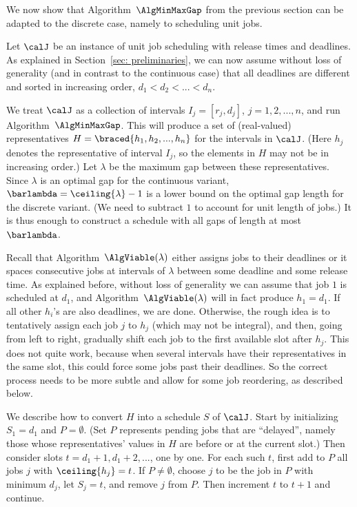 We now show that Algorithm~$\AlgMinMaxGap$ from the previous section can be adapted
to the discrete case, namely to scheduling unit jobs.

Let $\calJ$ be an instance of unit job scheduling with release times and deadlines.   
As explained in Section~\ref{sec: preliminaries},  we can now assume 
without loss of generality (and in contrast to the continuous case) that
all deadlines are different and sorted in increasing order, $d_1 < d_2 < ... < d_n$.

We treat $\calJ$ as a collection of intervals $I_j = [r_j,d_j]$, $j=1,2,...,n$, and
run Algorithm~$\AlgMinMaxGap$. This will produce a set of
(real-valued) representatives $H = \braced{h_1,h_2,...,h_n}$ for the intervals in $\calJ$. 
(Here $h_j$ denotes the representative of interval $I_j$, so the elements in $H$ may not be in increasing order.)
Let $\lambda$ be the maximum gap between these representatives. Since $\lambda$
is an optimal gap for the continuous variant, $\barlambda = \ceiling{\lambda}-1$
is a lower bound on the optimal gap length for the discrete variant.
(We need to subtract $1$ to account for unit length of jobs.)
It is thus enough to construct a schedule with all gaps of length at most $\barlambda$.

Recall that Algorithm~$\AlgViable(\lambda)$ either assigns jobs to their deadlines
or it spaces consecutive jobs at intervals of $\lambda$ between some deadline and some release time.
As explained before, without loss of generality we can assume that job $1$ is scheduled at $d_1$, and
Algorithm~$\AlgViable(\lambda)$ will in fact produce $h_1 = d_1$. 
If all other $h_i$'s are also deadlines, we are done. Otherwise, the rough idea is
to tentatively assign each job $j$ to $h_j$ (which may not be integral), and then, going from left to right,
gradually shift each job to the first available slot after $h_j$. This does not quite
work, because when several intervals have their representatives in the same slot, this
could force some jobs past their deadlines. So the correct process needs to be more
subtle and allow for some job reordering, as described below.



\medskip
{}
We describe how to convert $H$ into a schedule $S$ of $\calJ$. Start by initializing $S_1 = d_1$ and $P=\emptyset$. 
(Set $P$ represents pending jobs that are ``delayed'', namely those
whose representatives' values in $H$ are before or at the current slot.)
Then consider slots $t = d_1+1, d_1 +2 , ...$, one by one. For each such $t$, first add to $P$ all jobs $j$ with $\ceiling{h_j} = t$. 
If $P\neq\emptyset$, choose $j$ to be the job in $P$ with minimum $d_j$, let $S_j = t$, and remove $j$ from $P$.
Then increment $t$ to $t+1$ and continue.
\smallskip



